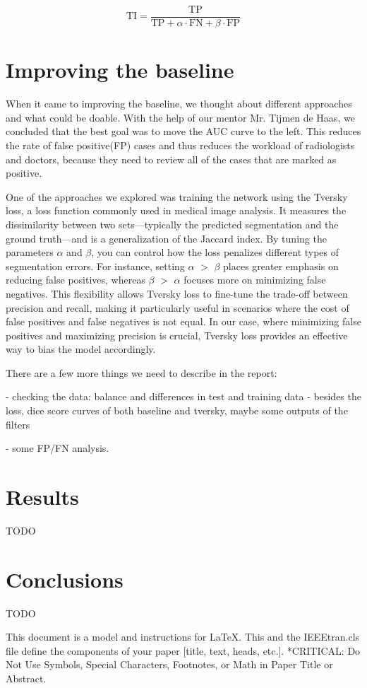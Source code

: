 \documentclass[conference]{IEEEtran}
\begin{document}
\[
\text{TI} = \frac{\text{TP}}{\text{TP} + \alpha \cdot \text{FN} + \beta \cdot \text{FP}}
\]


\section{Improving the baseline}
When it came to improving the baseline, we thought about different approaches and what could be doable. With the help of our mentor Mr. Tijmen de Haas, we concluded that the best goal was to move the AUC curve to the left. This reduces the rate of false positive(FP) cases and thus reduces the workload of radiologists and doctors, because they need to review all of the cases that are marked as positive.

One of the approaches we explored was training the network using the Tversky loss, a loss function commonly used in medical image analysis. It measures the dissimilarity between two sets—typically the predicted segmentation and the ground truth—and is a generalization of the Jaccard index.\cite{b3} By tuning the parameters $\alpha$ and $\beta$, you can control how the loss penalizes different types of segmentation errors. For instance, setting $\alpha$ $>$ $\beta$ places greater emphasis on reducing false positives, whereas $\beta$ $>$ $\alpha$ focuses more on minimizing false negatives. This flexibility allows Tversky loss to fine-tune the trade-off between precision and recall, making it particularly useful in scenarios where the cost of false positives and false negatives is not equal. In our case, where minimizing false positives and maximizing precision is crucial, Tversky loss provides an effective way to bias the model accordingly.

There are a few more things we need to describe in the report: 

- checking the data: balance and differences in test and training data
- besides the loss, dice score curves of both baseline and tversky, maybe some outputs of the filters

- some FP/FN analysis.


\section{Results}
TODO
\section{Conclusions}
TODO

This document is a model and instructions for \LaTeX.
This and the IEEEtran.cls file define the components of your paper [title, text, heads, etc.]. *CRITICAL: Do Not Use Symbols, Special Characters, Footnotes, 
or Math in Paper Title or Abstract.
\end{document}

